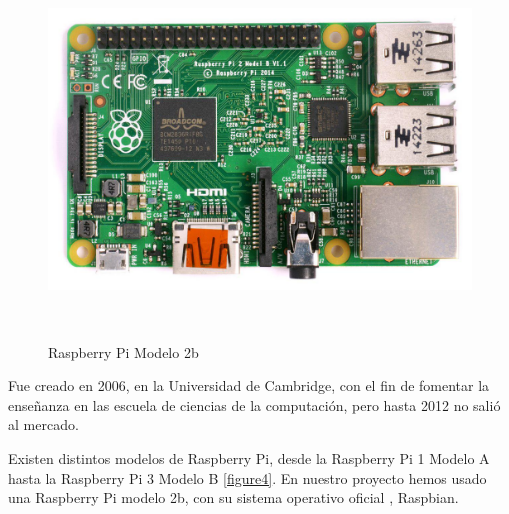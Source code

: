  \begin{figure}[htb]
 	
 	\begin{center}
 		\includegraphics[width=12cm,height=10cm]{figures/Raspberry_Pi.jpg}
 		\caption{Raspberry Pi Modelo 2b}
 	\end{center}
 	
 	\label{figure3}
 \end{figure}
 
Fue creado en 2006, en la Universidad de Cambridge, con el fin de fomentar la enseñanza en las escuela de ciencias de la computación, pero hasta 2012 no salió al mercado.

Existen distintos modelos de Raspberry Pi, desde la Raspberry Pi 1 Modelo A hasta la Raspberry Pi 3 Modelo B \ref{figure4}.
En nuestro proyecto hemos usado una Raspberry Pi modelo 2b, con su sistema operativo oficial , Raspbian.


